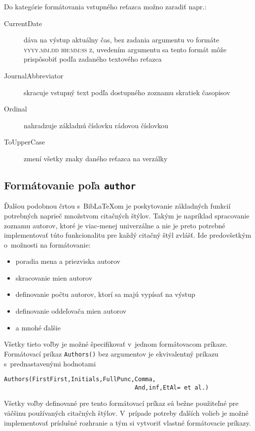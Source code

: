 \documentclass[
  color,
  table,
  nolof,
  oneside,
]{fithesis3}
\newcommand{\cmd}[1]{\texttt{#1}}
\begin{document}
\noindent Do kategórie formátovania vstupného reťazca možno zaradiť napr.:

\begin{description}
\item[CurrentDate] dáva na výstup aktuálny čas, bez zadania argumentu vo formáte \textsc{yyyy.mm.dd hh:mm:ss z}, uvedením argumentu sa tento formát môže prispôsobiť podľa zadaného textového reťazca
\item[JournalAbbreviator] skracuje vstupný text podľa dostupného zoznamu skratiek časopisov
\item[Ordinal] nahradzuje základnú číslovku rádovou číslovkou
\item[ToUpperCase] zmení všetky znaky daného reťazca na verzálky
\end{description}

\subsection{Formátovanie poľa \texttt{author}}

Ďalšou podobnou črtou s~BibLaTeXom je poskytovanie základných funkcií potrebných naprieč množstvom citačných štýlov. Takým je napríklad spracovanie zoznamu autorov, ktoré je viac-menej univerzálne a nie je preto potrebné implementovať túto funkcionalitu pre každý citačný štýl zvlášť. Ide predovšetkým o~možnosti na formátovanie:

\begin{itemize}
\item poradia mena a priezviska autorov
\item skracovanie mien autorov
\item definovanie počtu autorov, ktorí sa majú vypísať na výstup
\item definovanie oddeľovača mien autorov
\item a mnohé ďalšie
\end{itemize}

\noindent Všetky tieto voľby je možné špecifikovať v~jednom formátovacom príkaze. Formátovací príkaz \cmd{Authors()} bez argumentov je ekvivalentný príkazu s~prednastavenými hodnotami

\begin{verbatim}
Authors(FirstFirst,Initials,FullPunc,Comma,
                                     And,inf,EtAl= et al.)
\end{verbatim}

Všetky voľby definované pre tento formátovací príkaz sú bežne použiteľné pre väčšinu používaných citačných štýlov. V~prípade potreby ďalších volieb je možné implementovať príslušné rozhranie a tým si vytvoriť vlastné formátovacie príkazy.
\end{document}
